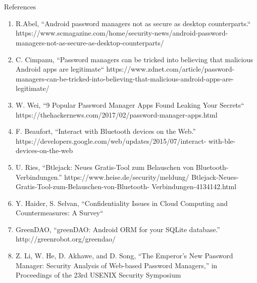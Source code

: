 \documentclass{beamer}
\begin{document}

\section*{}
\begin{frame}[shrink=50]{References}
\vspace{-10mm}
\begin{enumerate}
	\item R.Abel, “Android password managers not as secure as desktop counterparts.“ https://www.scmagazine.com/home/security-news/android-password-managers-not-as-secure-as-desktop-counterparts/ \\
	\item C. Cimpanu, “Password managers can be tricked into believing that malicious Android apps are legitimate“ https://www.zdnet.com/article/password-managers-can-be-tricked-into-believing-that-malicious-android-apps-are-legitimate/ \\
	\item W. Wei, “9 Popular Password Manager Apps Found Leaking Your Secrets“ https://thehackernews.com/2017/02/password-manager-apps.html \\
	\item F. Beaufort, “Interact with Bluetooth devices on the Web.” https://developers.google.com/web/updates/2015/07/interact- with-ble-devices-on-the-web \\
	\item U. Ries, “Btlejack: Neues Gratis-Tool zum Belauschen von Bluetooth- Verbindungen.” https://www.heise.de/security/meldung/ Btlejack-Neues-Gratis-Tool-zum-Belauschen-von-Bluetooth- Verbindungen-4134142.html \\
	\item Y. Haider, S. Selvan, “Confidentiality Issues in Cloud Computing and Countermeasures: A Survey“ \\
	\item GreenDAO, “greenDAO: Android ORM for your SQLite database.” http://greenrobot.org/greendao/ \\
	\item Z. Li, W. He, D. Akhawe, and D. Song, “The Emperor’s New Password Manager: Security Analysis of Web-based Password Managers,” in Proceedings of the 23rd USENIX Security Symposium \\
\end{enumerate}
\end{frame}
\end{document}
